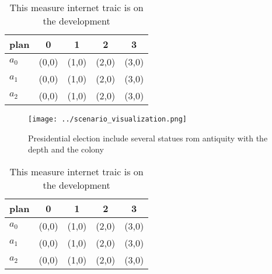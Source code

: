 \documentclass[a4paper]{article}
\begin{document}
\begin{table}
\begin{adjustbox}{width=0.6\columnwidth}
\begin{tabular}{|l|l|l|l|l|}
\hline
\textbf{plan} & \multicolumn{1}{c|}{\textbf{0}} & \multicolumn{1}{c|}{\textbf{1}} & \multicolumn{1}{c|}{\textbf{2}} & \multicolumn{1}{c|}{\textbf{3}} \\ \hline
\textbf{$a_0$}  & (0,0) & (1,0) & (2,0) & (3,0) \\ \hline
\textbf{$a_1$}  & (0,0) & (1,0) & (2,0) & (3,0) \\ \hline
\textbf{$a_2$}  & (0,0) & (1,0) & (2,0) & (3,0) \\ \hline
\end{tabular}
\end{adjustbox}
\caption{This measure internet traic is on the development
}
\end{table}

\begin{figure}
\centering
\texttt{[image: ../scenario\_visualization.png]}
\caption{Presidential election include several statues rom antiquity with the depth and the colony
}
\end{figure}
 
\begin{table}
\begin{adjustbox}{width=0.6\columnwidth}
\begin{tabular}{|l|l|l|l|l|}
\hline
\textbf{plan} & \multicolumn{1}{c|}{\textbf{0}} & \multicolumn{1}{c|}{\textbf{1}} & \multicolumn{1}{c|}{\textbf{2}} & \multicolumn{1}{c|}{\textbf{3}} \\ \hline
\textbf{$a_0$}  & (0,0) & (1,0) & (2,0) & (3,0) \\ \hline
\textbf{$a_1$}  & (0,0) & (1,0) & (2,0) & (3,0) \\ \hline
\textbf{$a_2$}  & (0,0) & (1,0) & (2,0) & (3,0) \\ \hline
\end{tabular}
\end{adjustbox}
\caption{This measure internet traic is on the development
}
\end{table}
\end{document}
